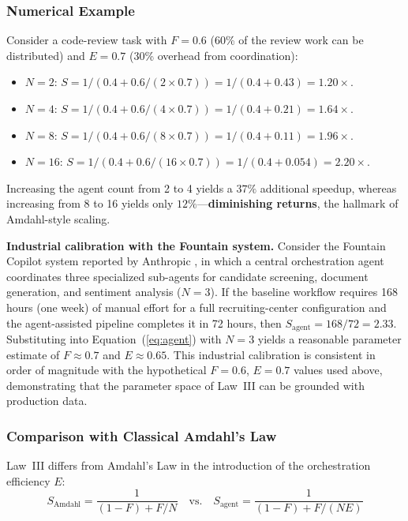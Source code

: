 \documentclass[11pt,a4paper]{article}
\begin{document}
\subsubsection{Numerical Example}

Consider a code-review task with $F = 0.6$ (60\% of the review work can be distributed) and $E = 0.7$ (30\% overhead from coordination):

\begin{itemize}[nosep]
\item $N = 2$: $S = 1/(0.4 + 0.6/(2 \times 0.7)) = 1/(0.4 + 0.43) = 1.20\times$.
\item $N = 4$: $S = 1/(0.4 + 0.6/(4 \times 0.7)) = 1/(0.4 + 0.21) = 1.64\times$.
\item $N = 8$: $S = 1/(0.4 + 0.6/(8 \times 0.7)) = 1/(0.4 + 0.11) = 1.96\times$.
\item $N = 16$: $S = 1/(0.4 + 0.6/(16 \times 0.7)) = 1/(0.4 + 0.054) = 2.20\times$.
\end{itemize}

Increasing the agent count from 2 to 4 yields a $37\%$ additional speedup, whereas increasing from 8 to 16 yields only $12\%$---\textbf{diminishing returns}, the hallmark of Amdahl-style scaling.

\textbf{Industrial calibration with the Fountain system.}
Consider the Fountain Copilot system reported by Anthropic \cite{anthropic2026agenticreport}, in which a central orchestration agent coordinates three specialized sub-agents for candidate screening, document generation, and sentiment analysis ($N=3$). If the baseline workflow requires 168 hours (one week) of manual effort for a full recruiting-center configuration and the agent-assisted pipeline completes it in 72 hours, then $S_{\mathrm{agent}} = 168/72 = 2.33$. Substituting into Equation~(\ref{eq:agent}) with $N=3$ yields a reasonable parameter estimate of $F \approx 0.7$ and $E \approx 0.65$. This industrial calibration is consistent in order of magnitude with the hypothetical $F = 0.6$, $E = 0.7$ values used above, demonstrating that the parameter space of Law~III can be grounded with production data.

\subsubsection{Comparison with Classical Amdahl's Law}

Law~III differs from Amdahl's Law in the introduction of the orchestration efficiency $E$:
\begin{equation}
S_{\mathrm{Amdahl}} = \frac{1}{(1-F) + F/N} \quad \text{vs.} \quad S_{\mathrm{agent}} = \frac{1}{(1-F) + F/(NE)}
\end{equation}
\end{document}
